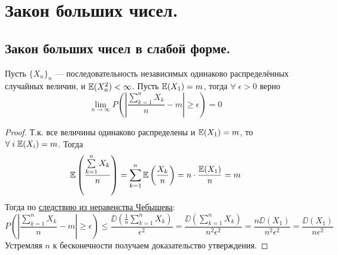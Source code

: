 \section{Закон больших чисел.}

\subsection{Закон больших чисел в слабой форме.}
\begin{lemma}
    Пусть $\{X_n\}_n$ --- последовательность независимых одинаково распределённых случайных величин, и $\mathbb{E}(X_n^2) < \infty$.
    Пусть $\mathbb{E}(X_1) = m$, тогда $\forall\;\epsilon > 0$ верно
    \[
        \lim\limits_{n \to \infty} P\left( \left| \frac{\sum\limits_{k = 1}^n X_k}{n} - m \right| \geq \epsilon \right) = 0
    \]
\end{lemma}
\begin{proof}
    Т.к. все величины одинаково распределены и $\mathbb{E}(X_1) = m$, то $\forall\; i\; \mathbb{E}(X_i) = m$. Тогда
    \[
        \mathbb{E}\left( \frac{\sum\limits_{k = 1}^n X_k}{n} \right) = \sum\limits_{k = 1}^n \mathbb{E}\left( \frac{X_k}{n} \right) =
        n \cdot \frac{\mathbb{E}(X_1)}{n} = m
    \]
    Тогда по \hyperref[ChebyshevCorollary]{следствию из неравенства Чебышева}:
    \[
        P\left( \left| \frac{\sum\limits_{k = 1}^n X_k}{n} - m \right| \geq \epsilon \right)
        \leq \frac{\DD\left(\frac{1}{n}\sum\limits_{k = 1}^n X_k\right)}{\epsilon^2} =
        \frac{\DD\left(\sum\limits_{k = 1}^n X_k\right)}{n^2\epsilon^2} =
        \frac{n\DD(X_1)}{n^2\epsilon^2} = \frac{\DD(X_1)}{n\epsilon^2}
    \]
    Устремляя $n$ к бесконечности получаем доказательство утверждения.
\end{proof}
\begin{comment}
    Пусть $X_k$ --- независимые бернулиевские случайные величины с вероятностью успеха $p$. Тогда величина
    $\frac{\sum\limits_{k = 1}^n X_k}{n}$ --- частота успешного исхода эксперимента при проведении $n$ независимых
    испытаний. Известно, что $\EE(X_k) = p$, тогда $\DD(X_k) = \EE(X_k^2) - \EE(X_k)^2 = p^2 - p = pq$, где $q = (1 - p)$.
    Тогда
    \[
        P\left( \left| \frac{\sum\limits_{k = 1}^n X_k}{n} - p \right| \geq \epsilon \right)
        \leq \frac{pq}{n\epsilon^2} \xrightarrow[n \to \infty]{} 0
    \]
    Т.е. при проведении большого числа испытаний, частота успешного результата эсперимента стремится к $p$.

    Можно разобрать смысл этого утверждения на примере: пусть эксперимент у нас состоит в подкидывании монеты, успехом
    мы считаем выпадение орла. Очевидно, что в одном независимом испытании орёл выпадает с вероятностью $\frac{1}{2}$.
    При этом в жизни подбрасывая монету $5, 10$ и даже $100$ раз мы можем ни разу не получить орла. Но данное утверждение
    говорит нам о том, что при проведении огромного числа испытаний, вероятность выпадения орла в среднем во всех испытаниях
    будет примерно $\frac{1}{2}$.
\end{comment}

